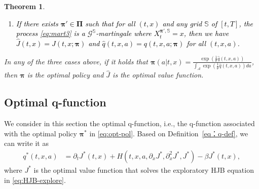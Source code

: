 \documentclass[11pt]{article}
\newtheorem{theorem}{Theorem}
\newtheorem{definition}{Definition}
\newcommand{\1}{\mathbbm{1}}
\newcommand{\rev}[1]{\textcolor{black}{{#1}}} %
\begin{document}
\begin{theorem}
\begin{enumerate}
	
	\item [(iii)]  \rev{ If there exists $\boldsymbol{\pi}' \in \boldsymbol{\Pi}$ such that for all $(t,x)$ and any grid $\mathbb{S}$ of $[t,T]$, the process \eqref{eq:mart3} is a $\mathcal{G}^{\mathbb{S}}$-martingale where $X^{\boldsymbol{\pi}', \mathbb{S}}_t =x$, then we have $\hat J(t,x) = J(t,x; \boldsymbol{\pi}) $ and $\hat q(t,x, a) = q(t,x, a; \boldsymbol{\pi}) $ for all $(t,x,a)$. }
\end{enumerate}

In any of the three cases above, if it holds that $\boldsymbol{\pi}(a|t,x) = \frac{\exp(\frac{1}{\theta} \hat q(t,x,a))} {\int_{\mathcal{A} } {\exp(\frac{1}{\theta} \hat q(t,x,a)) da}}$, then $\boldsymbol{\pi}$ is the optimal policy and $\hat J$ is the optimal value function.
\end{theorem}

\subsection{Optimal q-function}
We consider in this section the optimal q-function, i.e., the q-function associated with the optimal policy $\boldsymbol{\pi}^*$ in \eqref{eq:opt-pol}. Based on Definition~\ref{eq：q-def}, we can write it as
\begin{align}\label{eq：q-def-opt}
q^*(t,x, a) & = \partial_t J^*(t, x) +   H(t,x, a, \partial_xJ^*,  \partial_x^2J^*, J^*) - \beta J^*(t, x),
\end{align}
where $J^*$ is the optimal value function that solves the exploratory HJB equation in \eqref{eq:HJB-explore}.
\end{document}
